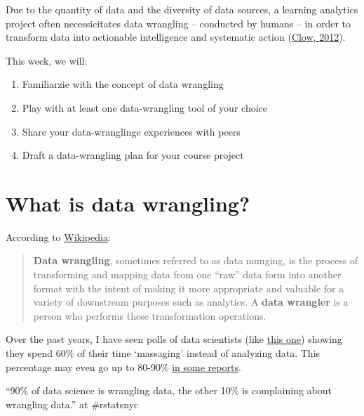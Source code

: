 \documentclass[
]{book}
\providecommand{\tightlist}{%
  \setlength{\itemsep}{0pt}\setlength{\parskip}{0pt}}
\begin{document}
Due to the quantity of data and the diversity of data sources, a learning analytics project often necessicitates data wrangling -- conducted by humans -- in order to transform data into actionable intelligence and systematic action (\href{https://dl.acm.org/citation.cfm?doid=2567574.2567603}{Clow, 2012}).

This week, we will:

\begin{enumerate}
\def\labelenumi{\arabic{enumi}.}
\tightlist
\item
  Familiarzie with the concept of data wrangling
\item
  Play with at least one data-wrangling tool of your choice
\item
  Share your data-wranglinge experiences with peers
\item
  Draft a data-wrangling plan for your course project
\end{enumerate}

\hypertarget{what-is-data-wrangling}{%
\section{What is data wrangling?}\label{what-is-data-wrangling}}

According to \href{https://en.wikipedia.org/wiki/Data_wrangling}{Wikipedia}:

\begin{quote}
\textbf{Data wrangling}, sometimes referred to as data munging, is the process of transforming and mapping data from one ``raw'' data form into another format with the intent of making it more appropriate and valuable for a variety of downstream purposes such as analytics. A \textbf{data wrangler} is a person who performs these transformation operations.
\end{quote}

Over the past years, I have seen polls of data scientists (like \href{https://www.forbes.com/sites/gilpress/2016/03/23/data-preparation-most-time-consuming-least-enjoyable-data-science-task-survey-says/\#4d660d346f63}{this one}) showing they spend 60\% of their time `massaging' instead of analyzing data. This percentage may even go up to 80-90\% \href{https://www.infoworld.com/article/3228245/data-science/the-80-20-data-science-dilemma.html}{in some reports}.

``90\% of data science is wrangling data, the other 10\% is complaining about wrangling data.''\citet{evelgab} at \#rstatsnyc
\end{document}
